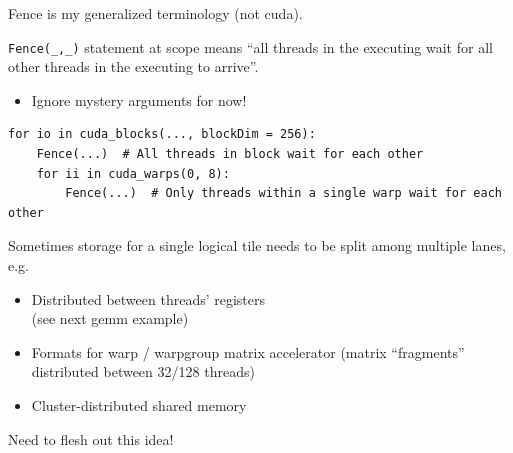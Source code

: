\begin{minipage}[t]{0.5\textwidth}\fixminipage
{}

Fence is my generalized terminology (not cuda).

\texttt{Fence(\_,\_)} statement at  scope means ``all threads in the executing  wait for all other threads in the executing  to arrive''.
\begin{itemize}
  \item Ignore mystery arguments for now!
\end{itemize}

\vspace{2mm}
{\tiny
\begin{verbatim}
for io in cuda_blocks(..., blockDim = 256):
    Fence(...)  # All threads in block wait for each other
    for ii in cuda_warps(0, 8):
        Fence(...)  # Only threads within a single warp wait for each other

\end{verbatim}
}
\vspace{6mm}


Sometimes storage for a single logical tile needs to be split among multiple lanes, e.g.
\begin{itemize}
  \item Distributed between threads' registers\\(see next gemm example)
  \item Formats for warp / warpgroup matrix accelerator (matrix ``fragments'' distributed between 32/128 threads)
  \item Cluster-distributed shared memory
\end{itemize}

Need to flesh out this idea!
\end{minipage}
\newpage
{}

